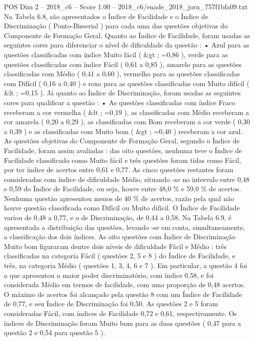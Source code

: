 \begin{textsample}{POS Dim 2 – 2018\_c6 – Score 1.00 – 2018\_c6/enade\_2018\_jorn\_757f1bfa09.txt}
Na Tabela 6.8, são apresentados o Índice de Facilidade e o Índice de Discriminação ( Ponto-Bisserial ) para cada uma das questões objetivas do Componente de Formação Geral.
Quanto ao Índice de Facilidade, foram usadas as seguintes cores para diferenciar o nível de dificuldade da questão : • Azul para as questões classificadas com índice Muito fácil ( \&gt ; =0,86 ), verde para as questões classificadas com índice Fácil ( 0,61 a 0,85 ), amarelo para as questões classificadas com Médio ( 0,41 a 0,60 ), vermelho para as questões classificadas com Difícil ( 0,16 a 0,40 ) e roxo para as questões classificadas com Muito difícil ( \&lt ; =0,15 ).
Já quanto ao Índice de Discriminação, foram usadas as seguintes cores para qualificar a questão : • As questões classificadas com índice Fraco receberam a cor vermelha ( \&lt ; =0,19 ), as classificadas com Médio receberam a cor amarela ( 0,20 a 0,29 ), as classificadas com Bom receberam a cor verde ( 0,30 a 0,39 ) e as classificadas com Muito bom ( \&gt ; =0,40 ) receberam a cor azul.
As questões objetivas do Componente de Formação Geral, segundo o Índice de Facilidade, foram assim avaliadas : das oito questões, nenhuma teve o Índice de Facilidade classificado como Muito fácil e três questões foram tidas como Fácil, por ter índice de acertos entre 0,61 e 0,77.
As cinco questões restantes foram consideradas com índice de dificuldade Médio, situando -se no intervalo entre 0,48 e 0,59 do Índice de Facilidade, ou seja, houve entre 48,0 \% e 59,0 \% de acertos.
Nenhuma questão apresentou menos de 40 \% de acertos, razão pela qual não houve questão classificada como Difícil ou Muito difícil.
O Índice de Facilidade variou de 0,48 a 0,77, e o de Discriminação, de 0,44 a 0,58.
Na Tabela 6.9, é apresentada a distribuição das questões, levando -se em conta, simultaneamente, a classificação dos dois índices.
As oito questões com Índice de Discriminação Muito bom figuraram dentre dois níveis de dificuldade Fácil e Médio : três classificadas na categoria Fácil ( questões 2, 5 e 8 ) do Índice de Facilidade, e três, na categoria Médio ( questões 1, 3, 4, 6 e 7 ).
Em particular, a questão 4 foi a que apresentou o maior poder discriminatório, com índice 0,58, e foi considerada Médio em termos de facilidade, com uma proporção de 0,48 acertos.
O máximo de acertos foi alcançado pela questão 8 com um Índice de Facilidade de 0,77, e seu Índice de Discriminação foi 0,50.
As questões 2 e 5 foram consideradas Fácil, com índices de Facilidade 0,72 e 0,61, respectivamente.
Os índices de Discriminação foram Muito bom para as duas questões ( 0,47 para a questão 2 e 0,54 para questão 5 ).

\end{textsample}
